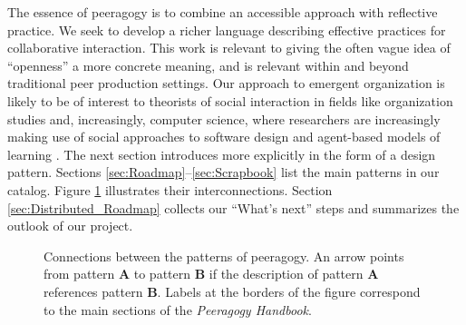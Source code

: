 The essence of peeragogy is to combine an accessible approach with reflective practice.   We seek to develop a richer language describing effective practices for collaborative interaction.  This work is relevant to giving the often vague idea of ``openness'' a more concrete meaning, and is relevant within and beyond traditional peer production settings.  Our approach to emergent organization is likely to be of interest to theorists of social interaction in fields like organization studies and, increasingly, computer science, where researchers are increasingly making use of social approaches to software design and agent-based models of learning \cite{minsky1967programming,poetry-workshop}.  The next section introduces  more explicitly in the form of a design pattern.  Sections \ref{sec:Roadmap}--\ref{sec:Scrapbook} list the main patterns in our catalog.    Figure \ref{fig:connections} illustrates their interconnections.  Section \ref{sec:Distributed_Roadmap} collects our ``What's next'' steps and summarizes the outlook of our project.

\begin{figure}
\vspace{-.9in}
{\centering


\par
}
\vspace{-.9in}
\caption{Connections between the patterns of peeragogy.  An arrow points from pattern \textbf{A} to pattern \textbf{B} if the description of pattern \textbf{A} references pattern \textbf{B}. Labels at the borders of the figure correspond to the main sections of the \emph{Peeragogy Handbook}.\label{fig:connections}}
\end{figure}


    
    
    
    
    
    
    
    

    
    
    
    
    
    
    
    